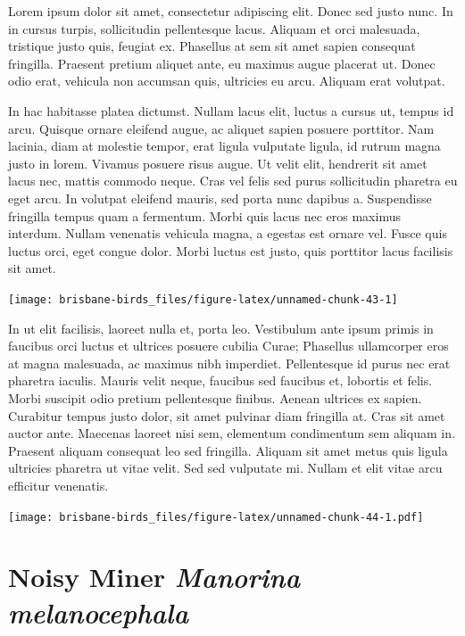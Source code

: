 \documentclass[]{book}
\let\origfigure\figure
\let\endorigfigure\endfigure
\renewenvironment{figure}[1][2] {
  \expandafter\origfigure\expandafter[H]
} {
  \endorigfigure
}
\begin{document}
Lorem ipsum dolor sit amet, consectetur adipiscing elit. Donec sed justo
nunc. In in cursus turpis, sollicitudin pellentesque lacus. Aliquam et
orci malesuada, tristique justo quis, feugiat ex. Phasellus at sem sit
amet sapien consequat fringilla. Praesent pretium aliquet ante, eu
maximus augue placerat ut. Donec odio erat, vehicula non accumsan quis,
ultricies eu arcu. Aliquam erat volutpat.

In hac habitasse platea dictumst. Nullam lacus elit, luctus a cursus ut,
tempus id arcu. Quisque ornare eleifend augue, ac aliquet sapien posuere
porttitor. Nam lacinia, diam at molestie tempor, erat ligula vulputate
ligula, id rutrum magna justo in lorem. Vivamus posuere risus augue. Ut
velit elit, hendrerit sit amet lacus nec, mattis commodo neque. Cras vel
felis sed purus sollicitudin pharetra eu eget arcu. In volutpat eleifend
mauris, sed porta nunc dapibus a. Suspendisse fringilla tempus quam a
fermentum. Morbi quis lacus nec eros maximus interdum. Nullam venenatis
vehicula magna, a egestas est ornare vel. Fusce quis luctus orci, eget
congue dolor. Morbi luctus est justo, quis porttitor lacus facilisis sit
amet.

\begin{figure}
\texttt{[image: brisbane-birds\_files/figure-latex/unnamed-chunk-43-1]} \caption{insert figure caption}\label{fig:unnamed-chunk-43}
\end{figure}

In ut elit facilisis, laoreet nulla et, porta leo. Vestibulum ante ipsum
primis in faucibus orci luctus et ultrices posuere cubilia Curae;
Phasellus ullamcorper eros at magna malesuada, ac maximus nibh
imperdiet. Pellentesque id purus nec erat pharetra iaculis. Mauris velit
neque, faucibus sed faucibus et, lobortis et felis. Morbi suscipit odio
pretium pellentesque finibus. Aenean ultrices ex sapien. Curabitur
tempus justo dolor, sit amet pulvinar diam fringilla at. Cras sit amet
auctor ante. Maecenas laoreet nisi sem, elementum condimentum sem
aliquam in. Praesent aliquam consequat leo sed fringilla. Aliquam sit
amet metus quis ligula ultricies pharetra ut vitae velit. Sed sed
vulputate mi. Nullam et elit vitae arcu efficitur venenatis.

\begin{figure}
\centering
\texttt{[image: brisbane-birds\_files/figure-latex/unnamed-chunk-44-1.pdf]}
\caption{\label{fig:unnamed-chunk-44}insert figure caption}
\end{figure}

\section{\texorpdfstring{Noisy Miner \emph{Manorina
melanocephala}}{Noisy Miner Manorina melanocephala}}\label{noisy-miner-manorina-melanocephala}
\end{document}
